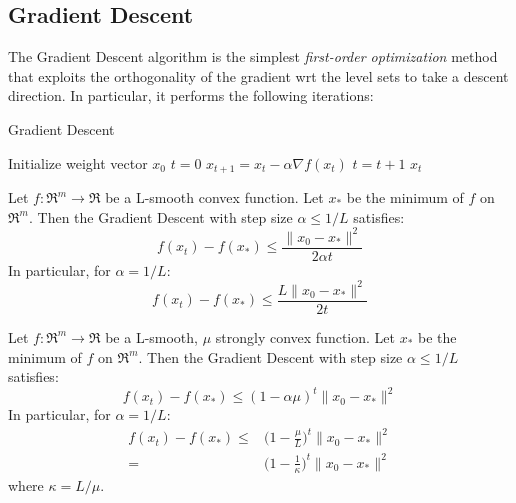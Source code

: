 \pagebreak

\subsection{Gradient Descent}

The Gradient Descent algorithm is the simplest \emph{first-order optimization} method that exploits the orthogonality of the gradient wrt the level sets to take a descent direction. In particular, it performs the following iterations:

\begin{algorithm}[H]
	\caption{Gradient Descent}
	\label{alg:gd}
	\begin{algorithmic}
			\State Initialize weight vector $x_0$
			\State $t = 0$
				\State $x_{t+1} = x_t - \alpha \nabla f(x_t)$
				\State $t = t + 1$
			\EndWhile
			\State \Return $x_t$
		\EndFunction
	\end{algorithmic}
\end{algorithm}

\begin{theorem} \label{thm:cvx_gd_convergence}
Let $f: \Re^m \rightarrow \Re$ be a L-smooth convex function. Let $x_*$ be the minimum of $f$ on $\Re^m$. Then the Gradient Descent with step size $\alpha \leq 1/L$ satisfies:
$$
f(x_t) - f(x_*) \leq \frac{\| x_0 - x_* \|^2}{2 \alpha t}
$$
In particular, for $\alpha = 1/L$:
$$
f(x_t) - f(x_*) \leq \frac{L \| x_0 - x_* \|^2}{2 t}
$$
\end{theorem}

\begin{theorem} \label{thm:str_cvx_convergence}
Let $f: \Re^m \rightarrow \Re$ be a L-smooth, $\mu$ strongly convex function. Let $x_*$ be the minimum of $f$ on $\Re^m$. Then the Gradient Descent with step size $\alpha \leq 1/L$ satisfies:
$$
f(x_t) - f(x_*) \leq (1 - \alpha \mu)^t \| x_0 - x_* \|^2
$$
In particular, for $\alpha = 1/L$:
$$
\begin{aligned}
	f(x_t) - f(x_*) \leq & \bigg(1 - \frac{\mu}{L}\bigg)^t \| x_0 - x_* \|^2 \\ 
						= & \bigg(1 - \frac{1}{\kappa}\bigg)^t \| x_0 - x_* \|^2
\end{aligned}
$$
where $\kappa = L/\mu$.
\end{theorem}

